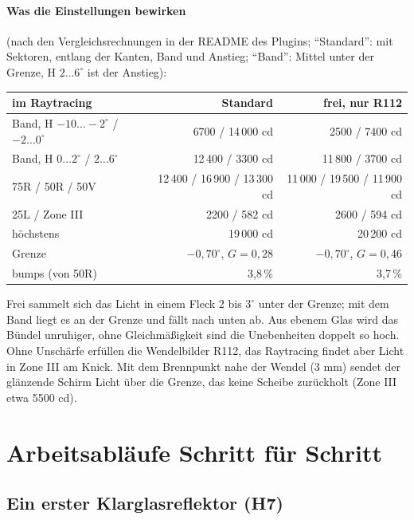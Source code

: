 \paragraph{Was die Einstellungen bewirken} (nach den Vergleichsrechnungen in der README des Plugins; \enquote{Standard}: mit Sektoren, entlang der Kanten, Band und Anstieg; \enquote{Band}: Mittel unter der Grenze, H $2 \dots 6^\circ$ ist der Anstieg):

\begin{center}
\small
\begin{tabular}{lrr}
\toprule
im Raytracing & Standard & frei, nur R112 \\
\midrule
Band, H $-10 \dots -2^\circ$ / $-2 \dots 0^\circ$ & 6700 / 14\,000 cd & 2500 / 7400 cd \\
Band, H $0 \dots 2^\circ$ / $2 \dots 6^\circ$ & 12\,400 / 3300 cd & 11\,800 / 3700 cd \\
75R / 50R / 50V & 12\,400 / 16\,900 / 13\,300 cd & 11\,000 / 19\,500 / 11\,900 cd \\
25L / Zone III & 2200 / 582 cd & 2600 / 594 cd \\
höchstens & 19\,000 cd & 20\,200 cd \\
Grenze & $-0{,}70^\circ$, $G = 0{,}28$ & $-0{,}70^\circ$, $G = 0{,}46$ \\
bumps (von 50R) & 3,8\,\% & 3,7\,\% \\
\bottomrule
\end{tabular}
\end{center}

Frei sammelt sich das Licht in einem Fleck 2 bis $3^\circ$ unter der Grenze; mit dem Band liegt es an der
Grenze und fällt nach unten ab. Aus ebenem Glas wird das Bündel unruhiger, ohne Gleichmäßigkeit sind
die Unebenheiten doppelt so hoch. Ohne Unschärfe erfüllen die Wendelbilder R112, das Raytracing findet
aber Licht in Zone III am Knick. Mit dem Brennpunkt nahe der Wendel (3 mm) sendet der glänzende Schirm
Licht über die Grenze, das keine Scheibe zurückholt (Zone III etwa 5500 cd).

\section{Arbeitsabläufe Schritt für Schritt}\label{sec:al-ablaeufe}

\subsection{Ein erster Klarglasreflektor (H7)}\label{sec:al-ablauf-h7}

